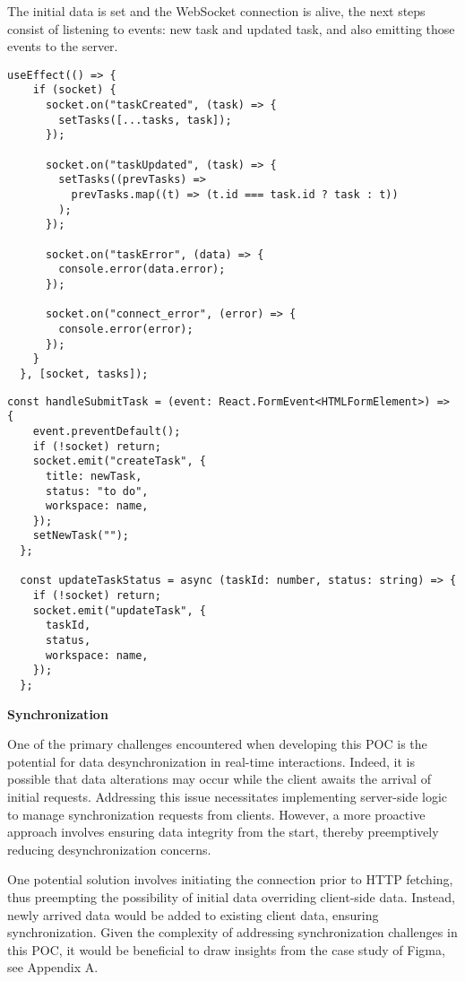 The initial data is set and the WebSocket connection is alive, the next steps consist of listening to events: new task and updated task, and also emitting those events to the server.

\begin{lstlisting}[caption=Listening to events]
  useEffect(() => {
    if (socket) {
      socket.on("taskCreated", (task) => {
        setTasks([...tasks, task]);
      });
 
      socket.on("taskUpdated", (task) => {
        setTasks((prevTasks) =>
          prevTasks.map((t) => (t.id === task.id ? task : t))
        );
      });
 
      socket.on("taskError", (data) => {
        console.error(data.error);
      });
 
      socket.on("connect_error", (error) => {
        console.error(error);
      });
    }
  }, [socket, tasks]);
\end{lstlisting}

\begin{lstlisting}[caption=Sending events]
  const handleSubmitTask = (event: React.FormEvent<HTMLFormElement>) => {
    event.preventDefault();
    if (!socket) return;
    socket.emit("createTask", {
      title: newTask,
      status: "to do",
      workspace: name,
    });
    setNewTask("");
  };
 
  const updateTaskStatus = async (taskId: number, status: string) => {
    if (!socket) return;
    socket.emit("updateTask", {
      taskId,
      status,
      workspace: name,
    });
  };
\end{lstlisting}

\textbf{Synchronization}

One of the primary challenges encountered when developing this POC is the potential for data desynchronization in real-time interactions. Indeed, it is possible that data alterations may occur while the client awaits the arrival of initial requests. Addressing this issue necessitates implementing server-side logic to manage synchronization requests from clients. However, a more proactive approach involves ensuring data integrity from the start, thereby preemptively reducing desynchronization concerns.

One potential solution involves initiating the connection prior to HTTP fetching, thus preempting the possibility of initial data overriding client-side data. Instead, newly arrived data would be added to existing client data, ensuring synchronization. Given the complexity of addressing synchronization challenges in this POC, it would be beneficial to draw insights from the case study of Figma, see Appendix A.

